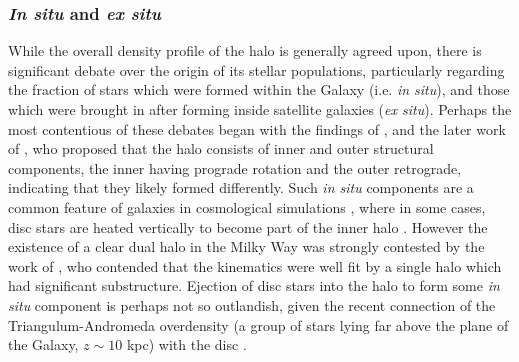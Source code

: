 \subsubsection{\emph{In situ} and \emph{ex situ}}
While the overall density profile of the halo is generally agreed upon, there is significant debate over the origin of its stellar populations, particularly regarding the fraction of stars which were formed within the Galaxy (i.e. \emph{in situ}), and those which were brought in after forming inside satellite galaxies (\emph{ex situ}). Perhaps the most contentious of these debates began with the findings of \citet{2007Natur.450.1020C}, and the later work of \citet{2012ApJ...746...34B}, who proposed that the halo consists of inner and outer structural components, the inner having prograde rotation and the outer retrograde, indicating that they likely formed differently. Such \emph{in situ} components are a common feature of galaxies in cosmological simulations \citep[e.g.][]{2011MNRAS.416.2802F,2012MNRAS.420.2245M}, where in some cases, disc stars are heated vertically to become part of the inner halo \citep[there appears to be evidence for such stars in M31, e.g.][]{2013ApJ...779..103D}. However the existence of a clear dual halo in the Milky Way was strongly contested by the work of \citet{2014ApJ...786....7S}, who contended that the kinematics were well fit by a single halo which had significant substructure. Ejection of disc stars into the halo to form some \emph{in situ} component is perhaps not so outlandish, given the recent connection of the Triangulum-Andromeda overdensity (a group of stars lying far above the plane of the Galaxy, $z \sim 10$ kpc) with the disc \citep{2015MNRAS.452..676P,2018Natur.555..334B}.

